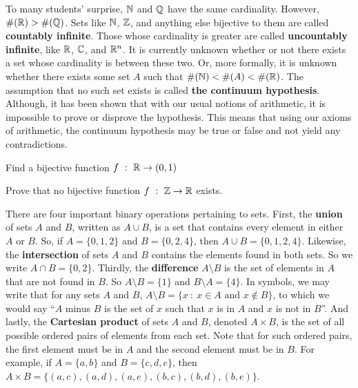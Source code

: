 To many students' surprise, $\mathbb{N}$ and $\mathbb{Q}$ have the same cardinality. However, $\#(\mathbb{R}) > \#(\mathbb{Q})$. Sets like $\mathbb{N}$, $\mathbb{Z}$, and anything else bijective to them are called \textbf{countably infinite}. Those whose cardinality is greater are called \textbf{uncountably infinite}, like $\mathbb{R}$, $\mathbb{C}$, and $\mathbb{R}^n$. It is currently unknown whether or not there exists a set whose cardinality is between these two. Or, more formally, it is unknown whether there exists some set $A$ such that $\#(\mathbb{N})<\#(A)<\#(\mathbb{R})$. The assumption that no such set exists is called \textbf{the continuum hypothesis}. Although, it has been shown that with our usual notions of arithmetic, it is impossible to prove or disprove the hypothesis. This means that using our axioms of arithmetic, the continuum hypothesis may be true or false and not yield any contradictions. \par

\begin{exercise}
    Find a bijective function $f\ : \ \mathbb{R} \to (0,1)$
\end{exercise}
\vspace{-5mm}
\begin{exercise}[Challenge]
    Prove that no bijective function $f\ : \ \mathbb{Z} \to \mathbb{R}$ exists.
\end{exercise}

There are four important binary operations pertaining to sets. First, the \textbf{union} of sets $A$ and $B$, written as $A\cup B$, is a set that contains every element in either $A$ or $B$. So, if $A=\{0,1,2\}$ and $B=\{0,2,4\}$, then $A\cup B=\{0,1,2,4\}$. Likewise, the \textbf{intersection} of sets $A$ and $B$ contains the elements found in both sets. So we write $A\cap B=\{0,2\}$. Thirdly, the \textbf{difference} $A \setminus B$ is the set of elements in $A$ that are not found in $B$. So $A \setminus B=\{1\}$ and $B \setminus A=\{4\}$. In symbols, we may write that for any sets $A$ and $B$, $A\setminus B=\{x\ :\ x\in A \text{ and } x\notin B\}$, to which we would say ``$A$ minus $B$ is the set of $x$ such that $x$ is in $A$ and $x$ is not in $B$''. And lastly, the \textbf{Cartesian product} of sets $A$ and $B$, denoted $A\times B$, is the set of all possible ordered pairs of elements from each set. Note that for such ordered pairs, the first element must be in $A$ and the second element must be in $B$. For example, if $A=\{a,b\}$ and $B=\{c,d,e\}$, then $A\times B = \{(a,c),(a,d),(a,e),(b,c),(b,d),(b,e)\}$. \par

